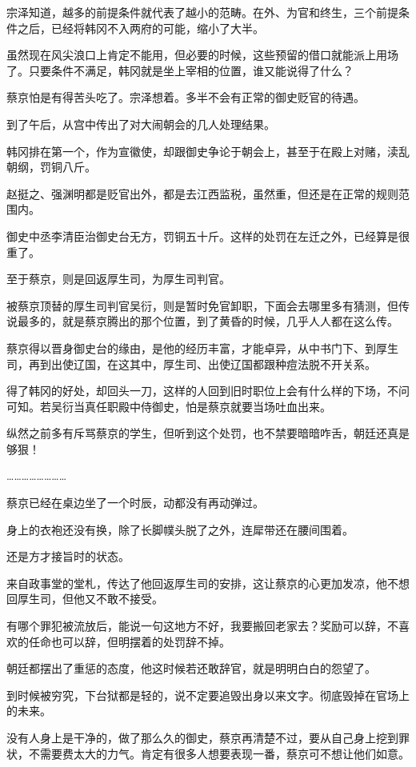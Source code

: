 宗泽知道，越多的前提条件就代表了越小的范畴。在外、为官和终生，三个前提条件之后，已经将韩冈不入两府的可能，缩小了大半。

虽然现在风尖浪口上肯定不能用，但必要的时候，这些预留的借口就能派上用场了。只要条件不满足，韩冈就是坐上宰相的位置，谁又能说得了什么？

蔡京怕是有得苦头吃了。宗泽想着。多半不会有正常的御史贬官的待遇。

到了午后，从宫中传出了对大闹朝会的几人处理结果。

韩冈排在第一个，作为宣徽使，却跟御史争论于朝会上，甚至于在殿上对赌，渎乱朝纲，罚铜八斤。

赵挺之、强渊明都是贬官出外，都是去江西监税，虽然重，但还是在正常的规则范围内。

御史中丞李清臣治御史台无方，罚铜五十斤。这样的处罚在左迁之外，已经算是很重了。

至于蔡京，则是回返厚生司，为厚生司判官。

被蔡京顶替的厚生司判官吴衍，则是暂时免官卸职，下面会去哪里多有猜测，但传说最多的，就是蔡京腾出的那个位置，到了黄昏的时候，几乎人人都在这么传。

蔡京得以晋身御史台的缘由，是他的经历丰富，才能卓异，从中书门下、到厚生司，再到出使辽国，在这其中，厚生司、出使辽国都跟种痘法脱不开关系。

得了韩冈的好处，却回头一刀，这样的人回到旧时职位上会有什么样的下场，不问可知。若吴衍当真任职殿中侍御史，怕是蔡京就要当场吐血出来。

纵然之前多有斥骂蔡京的学生，但听到这个处罚，也不禁要暗暗咋舌，朝廷还真是够狠！

……………………

蔡京已经在桌边坐了一个时辰，动都没有再动弹过。

身上的衣袍还没有换，除了长脚幞头脱了之外，连犀带还在腰间围着。

还是方才接旨时的状态。

来自政事堂的堂札，传达了他回返厚生司的安排，这让蔡京的心更加发凉，他不想回厚生司，但他又不敢不接受。

有哪个罪犯被流放后，能说一句这地方不好，我要搬回老家去？奖励可以辞，不喜欢的任命也可以辞，但明摆着的处罚辞不掉。

朝廷都摆出了重惩的态度，他这时候若还敢辞官，就是明明白白的怨望了。

到时候被穷究，下台狱都是轻的，说不定要追毁出身以来文字。彻底毁掉在官场上的未来。

没有人身上是干净的，做了那么久的御史，蔡京再清楚不过，要从自己身上挖到罪状，不需要费太大的力气。肯定有很多人想要表现一番，蔡京可不想让他们如意。

